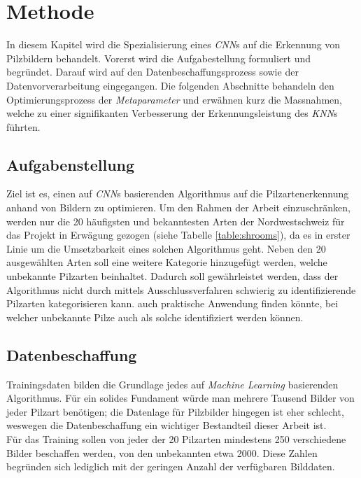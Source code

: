 \section{Methode}\label{cha:method}

In diesem Kapitel wird die Spezialisierung eines \textit{CNN}s auf die Erkennung von Pilzbildern behandelt. Vorerst wird die Aufgabestellung formuliert und begründet. Darauf wird auf den Datenbeschaffungsprozess sowie der Datenvorverarbeitung eingegangen. Die folgenden Abschnitte behandeln den Optimierungsprozess der \textit{Metaparameter} und erwähnen kurz die Massnahmen, welche zu einer signifikanten Verbesserung der Erkennungsleistung des \textit{KNN}s führten.

\subsection{Aufgabenstellung}\label{cha:aim}
Ziel ist es, einen auf \textit{CNN}s basierenden Algorithmus auf die Pilzartenerkennung anhand von Bildern zu optimieren. Um den Rahmen der Arbeit einzuschränken, werden nur die 20 häufigsten und bekanntesten Arten der Nordwestschweiz für das Projekt in Erwägung gezogen (siehe Tabelle \ref{table:shrooms}), da es in erster Linie um die Umsetzbarkeit eines solchen Algorithmus geht. Neben den 20 ausgewählten Arten soll eine weitere Kategorie hinzugefügt werden, welche unbekannte Pilzarten beinhaltet. Dadurch soll gewährleistet werden, dass der Algorithmus nicht durch mittels Ausschlussverfahren schwierig zu identifizierende Pilzarten kategorisieren kann. auch praktische Anwendung finden könnte, bei welcher unbekannte Pilze auch als solche identifiziert werden können. 

\subsection{Datenbeschaffung} \label{cha:met:datagathering}
Trainingsdaten bilden die Grundlage jedes auf \textit{Machine Learning} basierenden Algorithmus. Für ein solides Fundament würde man mehrere Tausend Bilder von jeder Pilzart benötigen; die Datenlage für Pilzbilder hingegen ist eher schlecht, weswegen die Datenbeschaffung ein wichtiger Bestandteil dieser Arbeit ist.\\

Für das Training sollen von jeder der 20 Pilzarten mindestens 250 verschiedene Bilder beschaffen werden, von den unbekannten etwa 2000. Diese Zahlen begründen sich lediglich mit der geringen Anzahl der verfügbaren Bilddaten.

